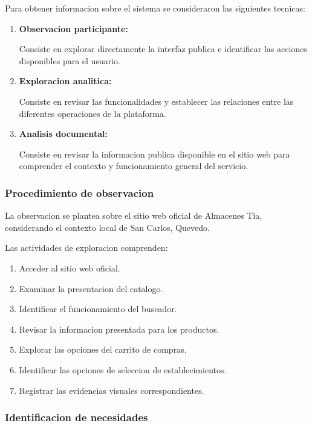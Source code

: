 \documentclass[12pt,a4paper]{article}
\begin{document}
Para obtener informacion sobre el sistema se
consideraron las siguientes tecnicas:

\begin{enumerate}

    \item \textbf{Observacion participante:}

    Consiste en explorar directamente la interfaz
    publica e identificar las acciones disponibles
    para el usuario.

    \item \textbf{Exploracion analitica:}

    Consiste en revisar las funcionalidades y
    establecer las relaciones entre las diferentes
    operaciones de la plataforma.

    \item \textbf{Analisis documental:}

    Consiste en revisar la informacion publica
    disponible en el sitio web para comprender
    el contexto y funcionamiento general del servicio.

\end{enumerate}

\subsubsection{Procedimiento de observacion}

La observacion se plantea sobre el sitio web oficial
de Almacenes Tia, considerando el contexto local
de San Carlos, Quevedo.

Las actividades de exploracion comprenden:

\begin{enumerate}
    \item Acceder al sitio web oficial.
    \item Examinar la presentacion del catalogo.
    \item Identificar el funcionamiento del buscador.
    \item Revisar la informacion presentada para
    los productos.
    \item Explorar las opciones del carrito de compras.
    \item Identificar las opciones de seleccion
    de establecimientos.
    \item Registrar las evidencias visuales
    correspondientes.
\end{enumerate}

\subsubsection{Identificacion de necesidades}
\end{document}
